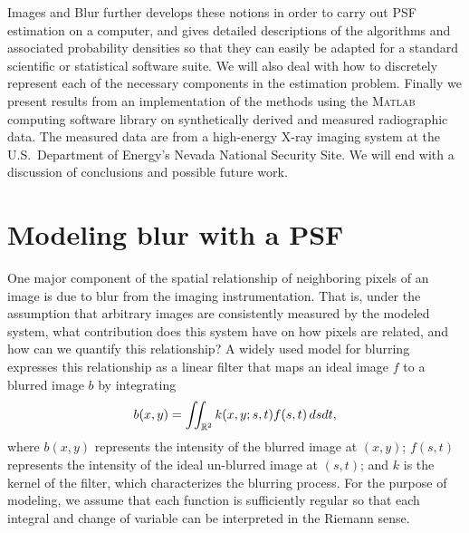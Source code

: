 \begin{chapter}{Images and Blur}
   further develops these notions in order to carry out PSF estimation on a computer, and gives detailed descriptions of the algorithms and associated probability densities so that they can easily be adapted for a standard scientific or statistical software suite. 
  We will also deal with how to discretely represent each of the necessary components in the estimation problem.
  Finally we present results from an implementation of the methods using the \textsc{Matlab} computing software library on synthetically derived and measured radiographic data.
  The measured data are from a high-energy X-ray imaging system at the U.S.~Department of Energy's Nevada National Security Site.
  We will end with a discussion of conclusions and possible future work.

\section{Modeling blur with a PSF}
  
  One major component of the spatial relationship of neighboring pixels of an image is due to blur from the imaging instrumentation.
  That is, under the assumption that arbitrary images are consistently measured by the modeled system, what contribution does this system have on how pixels are related, and how can we quantify this relationship?
  A widely used model for blurring \citep{hansen2010,jain1989,vogel2002,epstein2008} expresses this relationship as a linear filter that maps an ideal image $f$ to a blurred image $b$ by integrating
\begin{equation}\label{eq:generalFilterForm}
  b(x,y) = \iint_{\mathbb R^2} k(x,y;s,t) f(s,t)\,dsdt,
\end{equation}
  where $b(x,y)$ represents the intensity of the blurred image at $(x,y)$; $f(s,t)$ represents the intensity of the ideal un-blurred image at $(s,t)$; and $k$ is the kernel of the filter, which characterizes the blurring process.
  For the purpose of modeling, we assume that each function is sufficiently regular so that each integral and change of variable can be interpreted in the Riemann sense.


\end{chapter}

